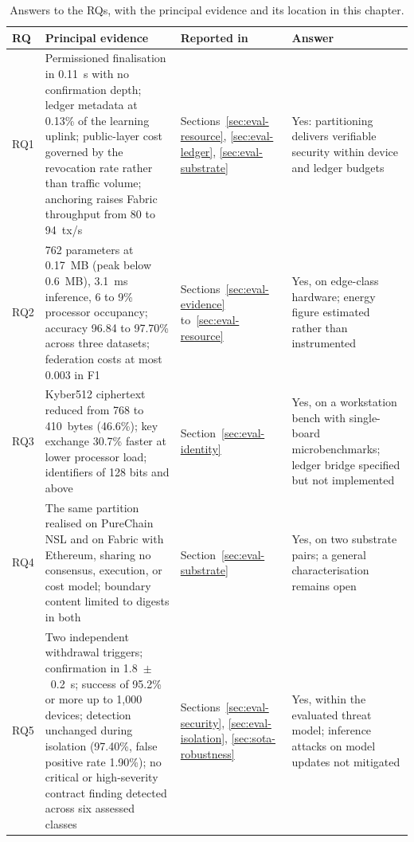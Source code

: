 \begin{table}[!htbp]
  \centering
  \footnotesize
  \setlength{\tabcolsep}{4pt}
  \renewcommand{\arraystretch}{1.3}
  \caption{Answers to the RQs, with the principal evidence and its location in this chapter.}
  \label{tab:rq-answers}
  \begin{tabularx}{\textwidth}{@{}
      >{\raggedright\arraybackslash}p{0.9cm}
      >{\raggedright\arraybackslash}X
      >{\raggedright\arraybackslash}p{2.0cm}
      >{\raggedright\arraybackslash}p{3.0cm}@{}}
    \toprule
    \textbf{RQ} & \textbf{Principal evidence} & \textbf{Reported in} & \textbf{Answer} \\
    \midrule
    RQ1 & Permissioned finalisation in 0.11~s with no confirmation depth; ledger metadata at 0.13\% of the learning uplink; public-layer cost governed by the revocation rate rather than traffic volume; anchoring raises Fabric throughput from 80 to 94~tx/s
        & Sections~\ref{sec:eval-resource}, \ref{sec:eval-ledger}, \ref{sec:eval-substrate}
        & Yes: partitioning delivers verifiable security within device and ledger budgets \\
    RQ2 & 41{,}762 parameters at 0.17~MB (peak below 0.6~MB), 3.1~ms inference, 6 to 9\% processor occupancy; accuracy 96.84 to 97.70\% across three datasets; federation costs at most 0.003 in F1
        & Sections~\ref{sec:eval-evidence} to~\ref{sec:eval-resource}
        & Yes, on edge-class hardware; energy figure estimated rather than instrumented \\
    RQ3 & Kyber512 ciphertext reduced from 768 to 410~bytes (46.6\%); key exchange 30.7\% faster at lower processor load; identifiers of 128 bits and above
        & Section~\ref{sec:eval-identity}
        & Yes, on a workstation bench with single-board microbenchmarks; ledger bridge specified but not implemented \\
    RQ4 & The same partition realised on PureChain NSL and on Fabric with Ethereum, sharing no consensus, execution, or cost model; boundary content limited to digests in both
        & Section~\ref{sec:eval-substrate}
        & Yes, on two substrate pairs; a general characterisation remains open \\
    RQ5 & Two independent withdrawal triggers; confirmation in 1.8~$\pm$~0.2~s; success of 95.2\% or more up to 1{,}000 devices; detection unchanged during isolation (97.40\%, false positive rate 1.90\%); no critical or high-severity contract finding detected across six assessed classes
        & Sections~\ref{sec:eval-security}, \ref{sec:eval-isolation}, \ref{sec:sota-robustness}
        & Yes, within the evaluated threat model; inference attacks on model updates not mitigated \\
    \bottomrule
  \end{tabularx}
\end{table}

